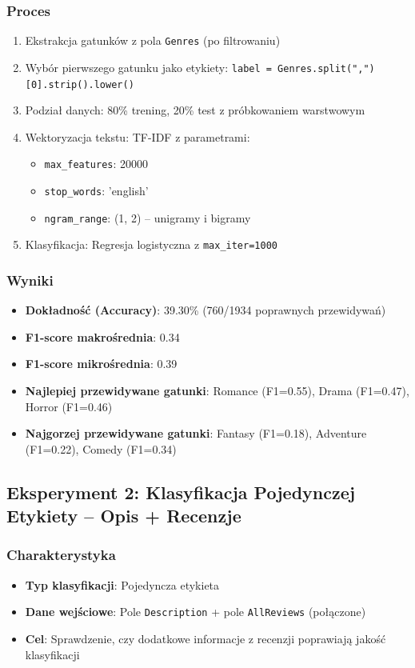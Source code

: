 \documentclass[12pt,a4paper]{article}
\begin{document}
\subsubsection{Proces}
\begin{enumerate}
    \item Ekstrakcja gatunków z pola \texttt{Genres} (po filtrowaniu)
    \item Wybór pierwszego gatunku jako etykiety: \texttt{label = Genres.split(",")[0].strip().lower()}
    \item Podział danych: 80\% trening, 20\% test z próbkowaniem warstwowym
    \item Wektoryzacja tekstu: TF-IDF z parametrami:
    \begin{itemize}
        \item \texttt{max\_features}: 20000
        \item \texttt{stop\_words}: 'english'
        \item \texttt{ngram\_range}: (1, 2) -- unigramy i bigramy
    \end{itemize}
    \item Klasyfikacja: Regresja logistyczna z \texttt{max\_iter=1000}
\end{enumerate}

\subsubsection{Wyniki}
\begin{itemize}
    \item \textbf{Dokładność (Accuracy)}: 39.30\% (760/1934 poprawnych przewidywań)
    \item \textbf{F1-score makrośrednia}: 0.34
    \item \textbf{F1-score mikrośrednia}: 0.39
    \item \textbf{Najlepiej przewidywane gatunki}: Romance (F1=0.55), Drama (F1=0.47), Horror (F1=0.46)
    \item \textbf{Najgorzej przewidywane gatunki}: Fantasy (F1=0.18), Adventure (F1=0.22), Comedy (F1=0.34)
\end{itemize}

\subsection{Eksperyment 2: Klasyfikacja Pojedynczej Etykiety -- Opis + Recenzje}

\subsubsection{Charakterystyka}
\begin{itemize}
    \item \textbf{Typ klasyfikacji}: Pojedyncza etykieta
    \item \textbf{Dane wejściowe}: Pole \texttt{Description} + pole \texttt{AllReviews} (połączone)
    \item \textbf{Cel}: Sprawdzenie, czy dodatkowe informacje z recenzji poprawiają jakość klasyfikacji
\end{itemize}
\end{document}
